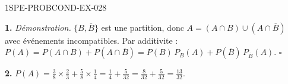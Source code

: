 \begin{corrige}{1SPE-PROBCOND-EX-028}

\textbf{1.} \textit{Démonstration.} $\{B, \overline{B}\}$ est une partition, donc $A = (A \cap B) \cup (A \cap \overline{B})$ avec événements incompatibles. Par additivite : $P(A) = P(A \cap B) + P(A \cap \overline{B}) = P(B)\,P_B(A) + P(\overline{B})\,P_{\overline{B}}(A)$. $\square$

\textbf{2.} $P(A) = \frac{3}{8}\times\frac{2}{3} + \frac{5}{8}\times\frac{1}{4} = \frac{1}{4}+\frac{5}{32} = \frac{8}{32}+\frac{5}{32} = \frac{13}{32}$.

\end{corrige}
